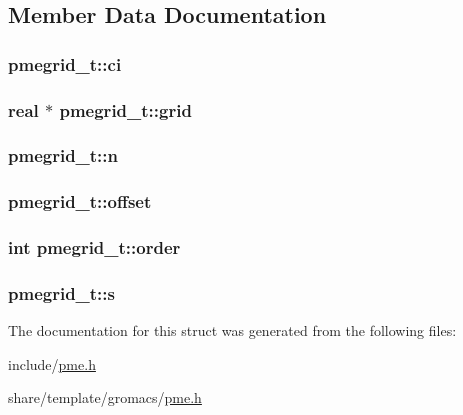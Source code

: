 \subsection{\-Member \-Data \-Documentation}
\hypertarget{structpmegrid__t_a0b808912a1ad3e4682c7d47aa85c1224}{
\subsubsection[{ci}]{ {\bf pmegrid\-\_\-t\-::ci}}}\label{structpmegrid__t_a0b808912a1ad3e4682c7d47aa85c1224}
\hypertarget{structpmegrid__t_ac27d10b1fb24474516d0c214a535edfa}{
\subsubsection[{grid}]{\setlength{\rightskip}{0pt plus 5cm}real $\ast$ {\bf pmegrid\-\_\-t\-::grid}}}\label{structpmegrid__t_ac27d10b1fb24474516d0c214a535edfa}
\hypertarget{structpmegrid__t_a4ce588917c738cfb101a288d65583ad3}{
\subsubsection[{n}]{ {\bf pmegrid\-\_\-t\-::n}}}\label{structpmegrid__t_a4ce588917c738cfb101a288d65583ad3}
\hypertarget{structpmegrid__t_a69d1480529b3727029021dea1159ace6}{
\subsubsection[{offset}]{ {\bf pmegrid\-\_\-t\-::offset}}}\label{structpmegrid__t_a69d1480529b3727029021dea1159ace6}
\hypertarget{structpmegrid__t_ac3cc87337dfb98aa2936cbad992c2a06}{
\subsubsection[{order}]{\setlength{\rightskip}{0pt plus 5cm}int {\bf pmegrid\-\_\-t\-::order}}}\label{structpmegrid__t_ac3cc87337dfb98aa2936cbad992c2a06}
\hypertarget{structpmegrid__t_a7f3838cb05afabb4c2b2f247a17b120e}{
\subsubsection[{s}]{ {\bf pmegrid\-\_\-t\-::s}}}\label{structpmegrid__t_a7f3838cb05afabb4c2b2f247a17b120e}


\-The documentation for this struct was generated from the following files\-:\begin{DoxyCompactItemize}
\item 
include/\hyperlink{include_2pme_8h}{pme.\-h}\item 
share/template/gromacs/\hyperlink{share_2template_2gromacs_2pme_8h}{pme.\-h}\end{DoxyCompactItemize}
